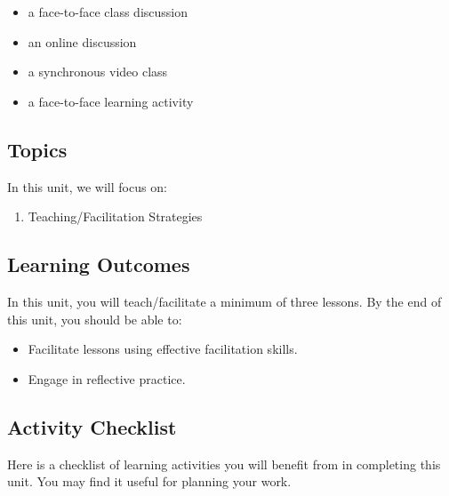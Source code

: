\documentclass[
]{book}
\providecommand{\tightlist}{%
  \setlength{\itemsep}{0pt}\setlength{\parskip}{0pt}}
\begin{document}
\begin{itemize}
\tightlist
\item
  a face-to-face class discussion\\
\item
  an online discussion\\
\item
  a synchronous video class\\
\item
  a face-to-face learning activity
\end{itemize}

\hypertarget{topics-4}{%
\subsection*{Topics}\label{topics-4}}

In this unit, we will focus on:

\begin{enumerate}
\def\labelenumi{\arabic{enumi}.}
\tightlist
\item
  Teaching/Facilitation Strategies
\end{enumerate}

\hypertarget{learning-outcomes-5}{%
\subsection*{Learning Outcomes}\label{learning-outcomes-5}}

In this unit, you will teach/facilitate a minimum of three lessons. By the end of this unit, you should be able to:

\begin{itemize}
\tightlist
\item
  Facilitate lessons using effective facilitation skills.\\
\item
  Engage in reflective practice.
\end{itemize}

\hypertarget{activity-checklist-4}{%
\subsection*{Activity Checklist}\label{activity-checklist-4}}

Here is a checklist of learning activities you will benefit from in completing this unit. You may find it useful for planning your work.
\end{document}
